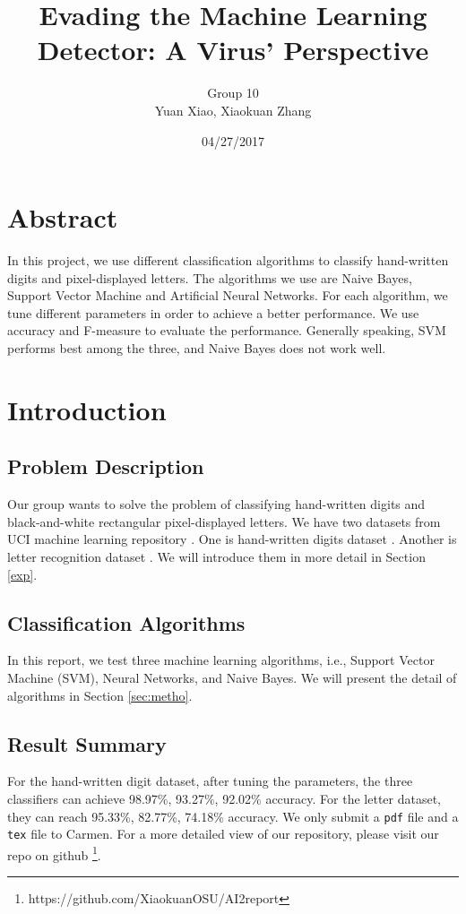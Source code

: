 \documentclass[11pt]{article}
\title{Evading the Machine Learning Detector: A Virus’ Perspective}
\author{Group 10 \\ Yuan Xiao, Xiaokuan Zhang}
\date{04/27/2017}
\begin{document}
\maketitle
\section*{Abstract}
In this project, we use different classification algorithms to classify hand-written digits and pixel-displayed letters. The algorithms we use are Naive Bayes, Support Vector Machine and Artificial Neural Networks. For each algorithm, we tune different parameters in order to achieve a better performance. We use accuracy and F-measure to evaluate the performance. Generally speaking, SVM performs best among the three, and Naive Bayes does not work well. 


\section{Introduction}

\subsection{Problem Description}
Our group wants to solve the problem of classifying hand-written digits and  black-and-white rectangular pixel-displayed letters. We have two datasets from UCI machine learning repository \cite{Lichman2013}. One is hand-written digits dataset \cite{digitdataset}. Another is letter recognition dataset \cite{letterdataset}. We will introduce them in more detail in Section \ref{exp}.

\subsection{Classification Algorithms}
In this report, we test three machine learning  algorithms, i.e., Support Vector Machine (SVM), Neural Networks, and Naive Bayes. We will present the detail of algorithms in Section \ref{sec:metho}.
\subsection{Result Summary}
For the hand-written digit dataset, after tuning the parameters, the three classifiers can achieve 98.97\%, 93.27\%, 92.02\%  accuracy. For the letter dataset, they can reach 95.33\%, 82.77\%, 74.18\% accuracy. We only submit a \texttt{pdf} file and a \texttt{tex} file to Carmen. For a more detailed view of our repository, please visit our repo on github \footnote{https://github.com/XiaokuanOSU/AI2report}.
\end{document}
